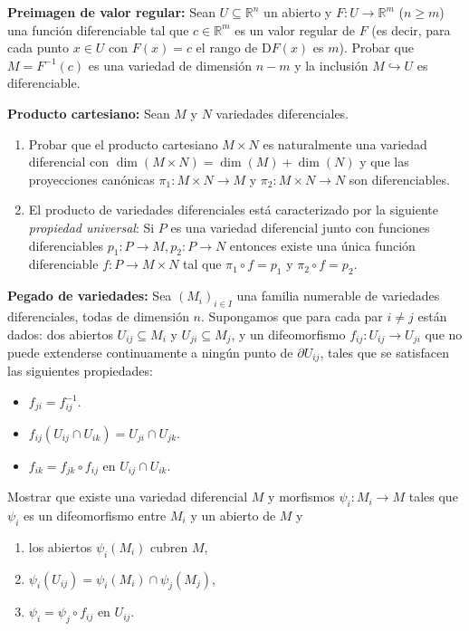 \documentclass[11pt]{article}
\newcommand{\R}{{\mathbb{R}}}
\numberwithin{theorem}{subsection}
\begin{document}
\begin{question}\textbf{Preimagen de valor regular:} Sean $U\subseteq\R^n$ un abierto y $F:U\to\R^m$ ($n\geq m$) una funci\'on diferenciable tal que $c\in\R^m$ es un valor regular de $F$ (es decir, para cada punto $x\in U$ con $F(x)=c$ el rango de $\mathrm{D}F(x)$ es $m$). Probar que $M=F^{-1}(c)$ es una variedad de dimensi\'on $n-m$ y la inclusi\'on $M\hookrightarrow U$ es diferenciable.
\end{question}

\begin{question}\textbf{Producto cartesiano:} Sean $M$ y $N$ variedades diferenciales.
	\begin{enumerate}
		\item Probar que el producto cartesiano $M\times N$ es naturalmente una variedad diferencial con $\dim(M\times N)=\dim(M)+\dim(N)$ y que las proyecciones can\'onicas $\pi_1:M\times N\to M$ y $\pi_2:M\times N\to N$ son diferenciables. 
		
		\item El producto de variedades diferenciales est\'a caracterizado por la siguiente \textit{propiedad universal}: Si $P$ es una variedad diferencial junto con funciones diferenciables $p_1:P\to M, p_2:P\to N$ entonces existe una \'unica funci\'on diferenciable $f:P\to M\times N$ tal que $\pi_1\circ f = p_1$ y $\pi_2\circ f = p_2$.
	\end{enumerate}
\end{question}

\begin{question}
	\textbf{Pegado de variedades:} Sea $(M_i)_{i\in I}$ una familia numerable de variedades diferenciales, todas de dimensi\'on $n$. Supongamos que para cada par $i\neq j$ est\'an dados: dos abiertos $U_{ij}\subseteq M_i$ y $U_{ji}\subseteq M_j$, y un difeomorfismo $f_{ij}:U_{ij}\to U_{ji}$ que no puede extenderse continuamente a ning\'un punto de $\partial U_{ij}$, tales que se satisfacen las siguientes propiedades:
	\begin{itemize}
		\item $f_{ji}=f_{ij}^{-1}$.
		\item $f_{ij}(U_{ij}\cap U_{ik}) = U_{ji}\cap U_{jk}$.
		\item $f_{ik} = f_{jk}\circ f_{ij}$ en $U_{ij}\cap U_{ik}$.
	\end{itemize}
	
	Mostrar que existe una variedad diferencial $M$ y morfismos $\psi_i:M_i\to M$ tales que $\psi_i$ es un difeomorfismo entre $M_i$ y un abierto de $M$ y
	\begin{enumerate}
		\item los abiertos $\psi_i(M_i)$ cubren $M$,
		\item $\psi_i(U_{ij})=\psi_i(M_i)\cap\psi_j(M_j)$,
		\item $\psi_i=\psi_j\circ f_{ij}$ en $U_{ij}$.
	\end{enumerate}
\end{question}
\end{document}

